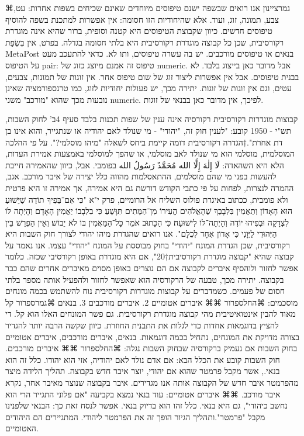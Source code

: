 ⌘גמר{ציינון}
אנו רואים שבשפה ישנם טיפוסים מיוחדים שאינם שכיחים בשפות אחרות: עט, צבע, תמונה,
זוג, ועוד. אלא שהיחודיות הזו חסומה: אין אפשרות למתכנת בשפה להוסיף טיפוסים
חדשים. כיוון שקבוצת הטיפוסים היא קטנה וסופית, ברור שהיא אינה מוגדרת רקורסיבית,
שכן כל קבוצה מוגדרת רקורסיבית היא בלתי חסומה בגדלה. בפרט, אין בִּשְׂפַת MetaPost
בנאים או טיפוסים מורכבים. יש בה עשרה טיפוסים, ותו לא. כדאי להתעכב מעט על
הטיפוס pair: טיפוס זה אמנם מיוצג כזוג של numeric. אבל מדובר כאן בייצוג בלבד. לא
בבנית טיפוסים. אבל אין אפשרות ליצור זוג של שום טיפוס אחר. אין זוגות של תמונות,
צבעים, עטים, וגם אין זוגות של זוגות. יתירה מכך, יש פעולות יחודיות לזוג, כמו
טרנספורמציה שאינן נובעות מכך שהוא "מורכב" משני numeric. לפיכך, אין מדובר כאן
בבנאי של זוגות.

קבוצות מוגדרות רקורסיבית
      רקורסיה אינה ענין של שפות תכנות בלבד
      סעיף 4ב' לחוק השבות, תש"י - 1950 קובע:
      "לענין חוק זה, "יהודי" - מי שנולד לאם יהודיה או שנתגייר, והוא אינו בן דת אחרת".†{הגדרה רקורסיבית דומה קיימת ביחס לשאלה "מיהו מוסלמי?". על פי ההלכה המוסלמית, מוסלמי הוא מי שנולד לאב מוסלמי, או שהפך למוסלמי באמצעות אמירת העדות, הלא היא השהאדה: لَا إِلٰهَ إِلَّا الله مُحَمَّدٌ رَسُولُ الله בפומבי. אבל, כיוון שהאמירה חייבת להעשות בפני מי שהם מוסלמים, ההתאסלמות מהווה כלל יצירה של איבר מורכב. אגב, ההמרה לנצרות, לפחות על פי כתבי הקודש דורשת גם היא אמירה, אך אמירה זו היא פרטית ולא פומבית, ככתוב באיגרת פולוס השליח אל הרומיים, פרק י"א "כִּי אִם־בְּפִיךָ תוֹדֶה שֶׁיֵּשׁוּעַ הוּא הָאָדוֹן וְתַאֲמִין בִּלְבָבְךָ שֶׁהָאֱלֹהִים הֱעִירוֹ מִן־הַמֵּתִים תִּוָּשֵׁעַ׃ כִּי בִלְבָבוֹ יַאֲמִין הָאָדָם וְהָיְתָה לּוֹ לִצְדָקָה וּבְפִיהוּ יוֹדֶה וְהָיְתָה־לּוֹ לִישׁוּעָה׃ כִּי הַכָּתוּב אֹמֵר כָּל־הַמַּאֲמִין בּוֹ לֹא יֵבוֹשׁ׃ וְאֵין הַפְרֵשׁ בֵּין הַיְּהוּדִי לַיְּוָנִי כִּי אָדוֹן אֶחָד לְכֻלָּם".}
      אנו רואים שהגדרת מיהו יהודי לצורך חוק השבות היא רקורסיבית, שכן הגדרת המונח "יהודי" בחוק מבוססת על המונח "יהודי" עצמו.
      אנו נאמר על קבוצה שהיא "קבוצה מוגדרת רקורסיבית†{20}", אם היא מוגדרת באופן רקורסיבי שכזה. כלומר אפשר לחזור ולוהסיף איברים לקבוצה אם הם נוצרים באופן מסוים מאיברים אחרים שהם כבר בקבוצה. יתירה מכך, טבעה של הרקורסיה הוא שאפשר לחזור ולהפעיל אותה מספר בלתי חסום של פעמים.
      כשמדברים על קבוצות מוגדרות רקורסיבית נוח להשתמש בכמה מונחים מוסכמים:
      ⌘החל{ספרור}
      ⌘⌘ איברים אטומיים
      2. איברים מורכבים
      3. בנאים
      ⌘גמר{ספרור}
      קל מאוד להבין אינטואיטיבית מהי קבוצה מוגדרת רקורסיבית. גם פשר המונחים האלו הוא קל. די להציץ בדוגמאות אחדות כדי לגלות את התבנית החוזרת. כיוון שקשה הרבה יותר להגדיר בצורה מדויקת את המונחים, נתחיל בכמה דוגמאות.
      בנאים, איברים מורכבים, איברים אטומיים בחוק השבות
      אם נעמיק ברקורסיה שבחוק השבות נגלה:
      ⌘החל{ספרור}
      ⌘⌘ איברים מורכבים. חוק השבות קובע את הכלל הבא: אם אדם נולד לאם יהודיה, אזי הוא יהודו. כלל זה הוא בנאי., אשר מקבל פרמטר שהוא אם יהודי, יוצר איבר חדש בקבוצה. תהליך הלידה מיצר מהפרמטר איבר חדש של הקבוצה אותה אנו מגדירים. איבר בקבוצה שנוצר מאיבר אחר, נקרא איבר מורכב.
      ⌘⌘ איברים אטומיים: עוד בנאי נמצא בקביעה "אם פלוני התגייר הרי הוא נחשב כיהודי", גם היא בנאי. כלל זהו הוא בדיוק בנאי. אפשר לנסח זאת כך: הבנאי שלפנינו מקבל "פרמטר".ותהליך הגיור הופך זה את הפרמטר ליהודי. המתגיירים הם היהודים האטומיים.
  
